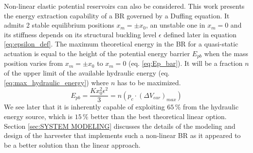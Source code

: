 \documentclass[3p,twocolumn,preprint]{elsarticle}
\begin{document}
Non-linear elastic potential reservoirs can also be considered. This work presents the energy extraction capability of a BR governed by a Duffing equation. It admits 2 stable equilibrium positions \mbox{$x_m=\pm x_0$}, an unstable one in \mbox{$x_m=0$} and its stiffness depends on its structural buckling level $\epsilon$ defined later in equation \ref{eq:epsilon_def}. The maximum theoretical energy in the BR for a quasi-static actuation is equal to the height of the potential energy barrier $E_{pb}$ when the mass position varies from \mbox{$x_m=\pm x_0$} to \mbox{$x_m=0$} (eq. \ref{eq:Ep_bar}). It will be a fraction $n$ of the upper limit of the available hydraulic energy (eq. \ref{eq:max_hydraulic_energy}) where $n$ has to be maximized. 
\begin{equation}
	E_{pb} = \dfrac{K x_0^2\epsilon^2}{3} = n(p_c \cdot (\Delta V_{ear})_{max})
	\label{eq:Ep_bar}
\end{equation}
We see later that it is inherently capable of exploiting $65$\,\% from the hydraulic energy source, which is $15$\,\% better than the best theoretical linear option. Section \ref{sec:SYSTEM MODELING} discusses the details of the modeling and design of the harvester that implements such a non-linear BR as it appeared to be a better solution than the linear approach. 
\end{document}
